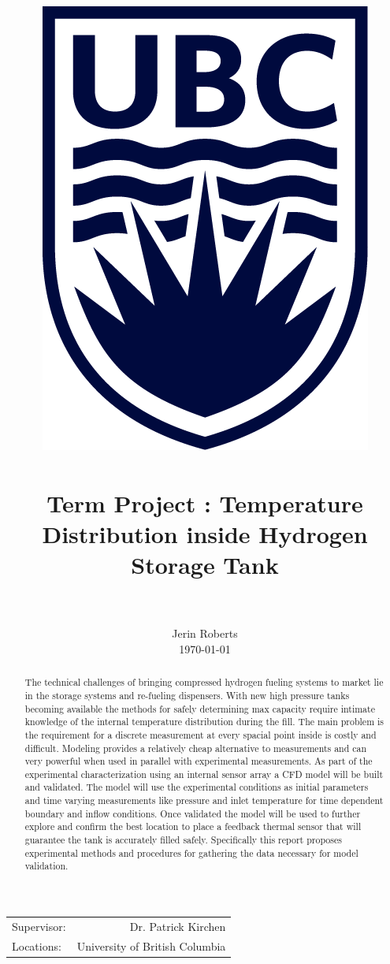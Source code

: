 \documentclass[paper=a4, fontsize=11pt, abstract=on]{scrartcl}
\title{
		\usefont{OT1}{bch}{b}{n}
		\normalfont \normalsize \textsc{} \\ [25pt]
		\includegraphics[width=0.2\linewidth]{ubc.png} \\
		\horrule{0.5pt} \\[0.2cm]
		\huge Term Project : Temperature Distribution inside Hydrogen Storage Tank \\
		\horrule{2pt} \\[0.005cm]
}
\author{
		\normalfont 								\normalsize
        Jerin Roberts\\[-5pt]		\normalsize
        \today
}
\date{}
\numberwithin{equation}{section}		%
\numberwithin{figure}{section}			%
\numberwithin{table}{section}				%
\begin{document}
\maketitle
\begin{center}
\begin{tabular}{l r}


Supervisor: & Dr. Patrick Kirchen  \\ %
Locations: & University of British Columbia


\end{tabular}
\end{center}
\newpage
\begin{abstract}
The technical challenges of bringing compressed hydrogen fueling systems to market lie in the storage systems and re-fueling dispensers. With new high pressure tanks becoming available the methods for safely determining max capacity require intimate knowledge of the internal temperature distribution during the fill. The main problem is the requirement for a discrete measurement at every spacial point inside is costly and difficult. Modeling provides a relatively cheap alternative to measurements and can very powerful when used in parallel with experimental measurements. As part of the experimental characterization using an internal sensor array a CFD model will be built and validated. The model will use the experimental conditions as initial parameters and time varying measurements like pressure and inlet temperature for time dependent boundary and inflow conditions. Once validated the model will be used to further explore and confirm the best location to place a feedback thermal sensor that will guarantee the tank is accurately filled safely. Specifically this report proposes experimental methods and procedures for gathering the data necessary for model validation.
\end{abstract}


\newpage
\tableofcontents
\listoffigures
\listoftables
\newpage
\lstset{language=[Visual]C++}

\mbox{}%

 
\end{document}
